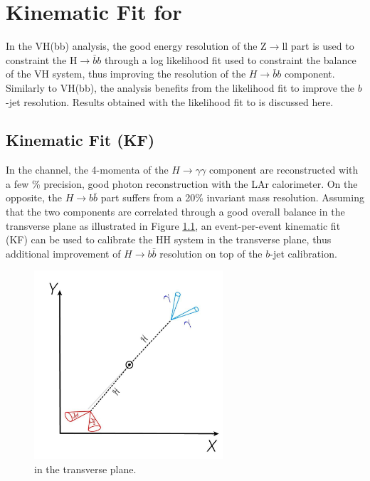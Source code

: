 \chapter{Kinematic Fit for \HHyybb}
\label{Adx4}

In the VH(bb) analysis, the good energy resolution of the Z$\to$ll part is used to constraint the H$\to\bar{b}b$ through a log likelihood fit used to constraint the balance of the VH system, thus improving the resolution of the $H\to\bar{b}b$ component. Similarly to VH(bb), the \HHyybb analysis benefits from the likelihood fit to improve the $b$-jet resolution. Results obtained with the likelihood fit to \HHyybb is discussed here.

\section{Kinematic Fit (KF)}
In the \HHyybb channel, the 4-momenta of the $H\to\gamma\gamma$ component are reconstructed with a few \% precision, good photon reconstruction with the LAr calorimeter. On the opposite, the $H\to b\bar{b}$ part suffers from a 20\% invariant mass resolution. Assuming that the two components are correlated through a good overall balance in the transverse plane as illustrated in Figure \ref{fig:Adx4:HH}, an event-per-event kinematic fit (KF) can be used to calibrate the HH system in the transverse plane, thus additional improvement of $H\to b\bar{b}$ resolution on top of the $b$-jet calibration.
\begin{figure}[H]
    \centering
    \includegraphics[width=7cm,height=7cm]{Adx/Adx4/Img/HH.png}
    \begin{tcolorbox}[colback=black!5!white,colframe=white!75!black]
    \caption{\HHyybb in the transverse plane.}
    \label{fig:Adx4:HH}
    \end{tcolorbox}

\end{figure}
